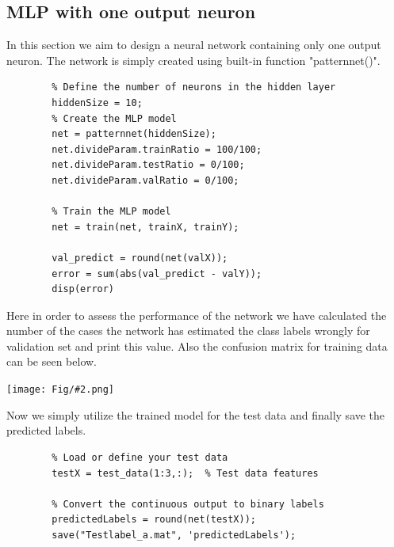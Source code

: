 \documentclass[]{article}
\newcommand{\pict}[2]{\begin{center}
		\texttt{[image: Fig/\#2.png]}
\end{center}}
\begin{document}
	\subsection{MLP with one output neuron}
	In this section we aim to design a neural network containing only one output neuron. The network is simply created using built-in function "patternnet()".
	\begin{lstlisting}
		% Define the number of neurons in the hidden layer
		hiddenSize = 10;
		% Create the MLP model
		net = patternnet(hiddenSize);
		net.divideParam.trainRatio = 100/100;
		net.divideParam.testRatio = 0/100;
		net.divideParam.valRatio = 0/100;
		
		% Train the MLP model
		net = train(net, trainX, trainY);
		
		val_predict = round(net(valX));
		error = sum(abs(val_predict - valY));
		disp(error)
	\end{lstlisting}
	Here in order to assess the performance of the network we have calculated the number of the cases the network has estimated the class labels wrongly for validation set and print this value. Also the confusion matrix for training data can be seen below.
	\pict{0.25}{F15}
	Now we simply utilize the trained model for the test data and finally save the predicted labels.
	\begin{lstlisting}
		% Load or define your test data
		testX = test_data(1:3,:);  % Test data features
		
		% Convert the continuous output to binary labels
		predictedLabels = round(net(testX));
		save("Testlabel_a.mat", 'predictedLabels');
	\end{lstlisting}
	
\end{document}
